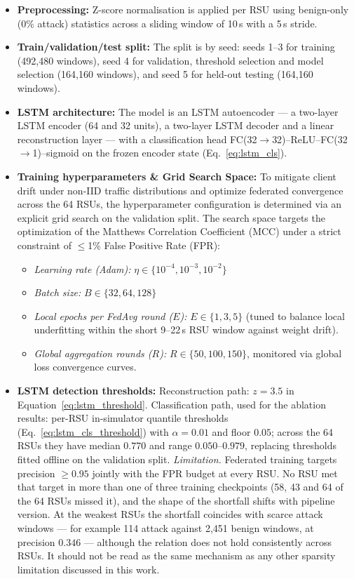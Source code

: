 \documentclass[12pt, a4paper]{report}
\begin{document}
{{\begin{itemize}
    \item \textbf{Preprocessing:} Z-score normalisation is applied per RSU using benign-only (0\% attack) statistics across a sliding window of 10\,s with a 5\,s stride.
    \item \textbf{Train/validation/test split:} The split is by seed: seeds 1--3 for training (492{,}480 windows), seed 4 for validation, threshold selection and model selection (164{,}160 windows), and seed 5 for held-out testing (164{,}160 windows).
    \item \textbf{LSTM architecture:} The model is an LSTM autoencoder --- a two-layer LSTM encoder (64 and 32 units), a two-layer LSTM decoder and a linear reconstruction layer --- with a classification head FC(32$\to$32)--ReLU--FC(32$\to$1)--sigmoid on the frozen encoder state (Eq.~\ref{eq:lstm_cls}).
    \item \textbf{Training hyperparameters \& Grid Search Space:} To mitigate client drift under non-IID traffic distributions and optimize federated convergence across the 64 RSUs, the hyperparameter configuration is determined via an explicit grid search on the validation split. The search space targets the optimization of the Matthews Correlation Coefficient (MCC) under a strict constraint of $\le$1\% False Positive Rate (FPR):
    \begin{itemize}
        \item \textit{Learning rate (Adam):} $\eta \in \{10^{-4}, 10^{-3}, 10^{-2}\}$
        \item \textit{Batch size:} $B \in \{32, 64, 128\}$
        \item \textit{Local epochs per FedAvg round ($E$):} $E \in \{1, 3, 5\}$ (tuned to balance local underfitting within the short 9--22\,s RSU window against weight drift).
        \item \textit{Global aggregation rounds ($R$):} $R \in \{50, 100, 150\}$, monitored via global loss convergence curves.
    \end{itemize}
    \item \textbf{LSTM detection thresholds:} Reconstruction path: $z = 3.5$ in Equation~\eqref{eq:lstm_threshold}. Classification path, used for the ablation results: per-\ac{RSU} in-simulator quantile thresholds (Eq.~\ref{eq:lstm_cls_threshold}) with $\alpha = 0.01$ and floor $0.05$; across the 64 \ac{RSU}s they have median $0.770$ and range $0.050$--$0.979$, replacing thresholds fitted offline on the validation split. \textit{Limitation.} Federated training targets precision $\geq 0.95$ jointly with the FPR budget at every \ac{RSU}. No \ac{RSU} met that target in more than one of three training checkpoints (58, 43 and 64 of the 64 \ac{RSU}s missed it), and the shape of the shortfall shifts with pipeline version. At the weakest \ac{RSU}s the shortfall coincides with scarce attack windows --- for example 114 attack against 2{,}451 benign windows, at precision $0.346$ --- although the relation does not hold consistently across \ac{RSU}s. It should not be read as the same mechanism as any other sparsity limitation discussed in this work.

\end{itemize}}}
\end{document}
